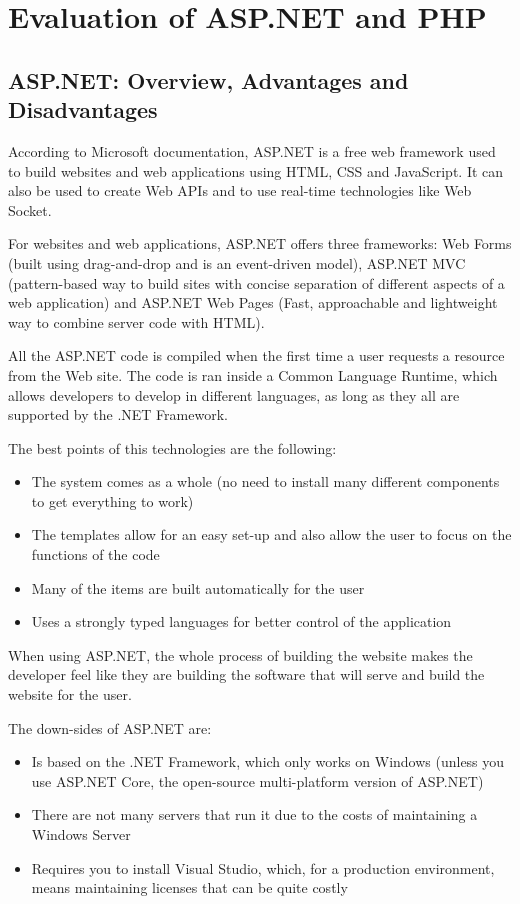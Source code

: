 \chapter{Evaluation of ASP.NET and PHP}

\section{ASP.NET: Overview, Advantages and Disadvantages}

According to Microsoft documentation, ASP.NET is a free web framework used to build websites and web applications using HTML, CSS and JavaScript. It can also be used to create Web APIs and to use real-time technologies like Web Socket.

For websites and web applications, ASP.NET offers three frameworks: Web Forms (built using drag-and-drop and is an event-driven model), ASP.NET MVC (pattern-based way to build sites with concise separation of different aspects of a web application) and ASP.NET Web Pages (Fast, approachable and lightweight way to combine server code with HTML).

All the ASP.NET code is compiled when the first time a user requests a resource from the Web site. The code is ran inside a Common Language Runtime, which allows developers to develop in different languages, as long as they all are supported by the .NET Framework.

The best points of this technologies are the following:
\begin{itemize}
  \item The system comes as a whole (no need to install many different components to get everything to work)
  \item The templates allow for an easy set-up and also allow the user to focus on the functions of the code
  \item Many of the items are built automatically for the user
  \item Uses a strongly typed languages for better control of the application
\end{itemize}

When using ASP.NET, the whole process of building the website makes the developer feel like they are building the software that will serve and build the website for the user.

The down-sides of ASP.NET are:
\begin{itemize}
  \item Is based on the .NET Framework, which only works on Windows (unless you use ASP.NET Core, the open-source multi-platform version of ASP.NET)
  \item There are not many servers that run it due to the costs of maintaining a Windows Server
  \item Requires you to install Visual Studio, which, for a production environment, means maintaining licenses that can be quite costly
\end{itemize}

